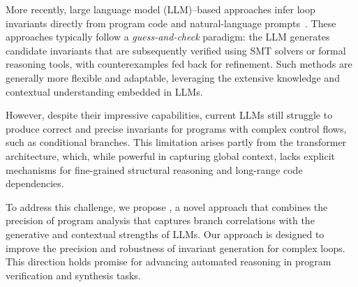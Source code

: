 More recently, large language model (LLM)–based approaches infer loop invariants directly from program code and natural-language prompts~\cite{wu2024llm,cao2025clause2inv,LIU2026103387}. These approaches typically follow a \emph{guess-and-check} paradigm: the LLM generates candidate invariants that are subsequently verified using SMT solvers or formal reasoning tools, with counterexamples fed back for refinement. 
Such methods are generally more flexible and adaptable, leveraging the extensive knowledge and contextual understanding embedded in LLMs.

However, despite their impressive capabilities, current LLMs still struggle to produce correct and precise invariants for programs with complex control flows, such as conditional branches. This limitation arises partly from the transformer architecture, which, while powerful in capturing global context, lacks explicit mechanisms for fine-grained structural reasoning and long-range code dependencies.

To address this challenge, we propose \thistool, a novel approach that combines the precision of program analysis that captures branch correlations with the generative and contextual strengths of LLMs. Our approach is designed to improve the precision and robustness of invariant generation for complex loops. This direction holds promise for advancing automated reasoning in program verification and synthesis tasks.
